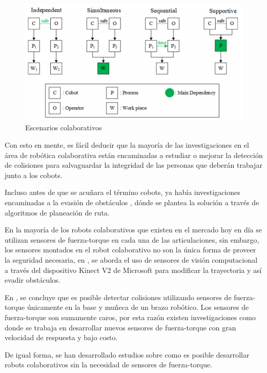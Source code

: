 \begin{figure}
    \centering
    \includegraphics[scale=0.8]{./img/chapter2/escenarioscolaborativos.png}
    \caption{Escenarios colaborativos}
    \label{fig:escenarioscolaborativos}
\end{figure}

Con esto en mente, es fácil deducir que la mayoría de las investigaciones en el área de robótica colaborativa están encaminadas a estudiar o mejorar la detección de colisiones para salvaguardar la integridad de las personas que deberán trabajar junto a los cobots.

Incluso antes de que se acuñara el término cobots, ya había investigaciones encaminadas a la evasión de obstáculos \cite{Khatib1986}, dónde se plantea la solución a través de algoritmos de planeación de ruta.


En la mayoría de los robots colaborativos que existen en el mercado hoy en día se utilizan sensores de fuerza-torque en cada una de las articulaciones, sin embargo, los sensores montados en el robot colaborativo no son la única forma de proveer la seguridad necesaria, en \cite{Teke2018}, se aborda el uso de sensores de visión computacional a través del dispositivo Kinect V2 de Microsoft para modificar la trayectoria y así evadir obstáculos.

En \cite{Lu2005}, se concluye que es posible detectar colisiones utilizando sensores de fuerza-torque únicamente en la base y muñeca de un brazo robótico. Los sensores de fuerza-torque son sumamente caros, por esta razón existen investigaciones como \cite{Phan2018} donde se trabaja en desarrollar nuevos sensores de fuerza-torque con gran velocidad de respuesta y bajo costo.

De igual forma, se han desarrollado estudios sobre como es posible desarrollar robots colaborativos sin la necesidad de sensores de fuerza-torque.

